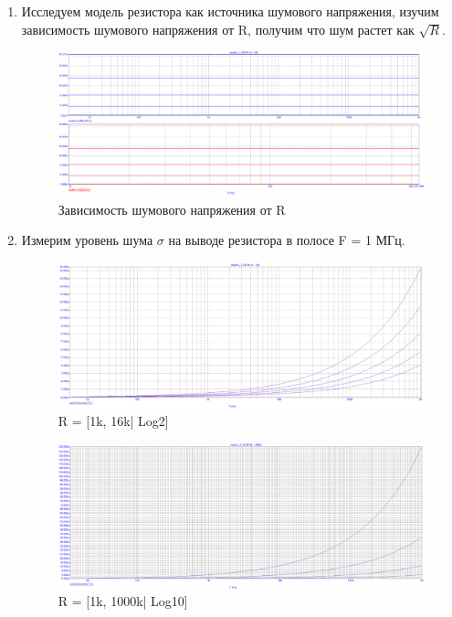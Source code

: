 \documentclass[a4paper, 12pt]{article}%
\begin{document}
\begin{enumerate}

\item

Исследуем модель резистора как источника шумового напряжения, изучим зависимость шумового напряжения от R, получим что шум растет как $\sqrt{R}$.

\begin{figure}[h!]
    \centering
    \includegraphics[scale=0.3]{images/mod1_1_1_2.png}
    \caption{Зависимость шумового напряжения от R}
    \label{fig:eR}
\end{figure}

\item

Измерим уровень шума $\sigma$ на выводе резистора в полосе F = 1 МГц.

\begin{figure}[h!]
    \centering
    \includegraphics[scale=0.3]{images/mod1_1_2_1.png}
    \caption{R = [1k, 16k| Log2]}
    \label{fig:R16}
\end{figure}

\begin{figure}[h!]
    \centering
    \includegraphics[scale=0.3]{images/mod1_1_2_2.png}
    \caption{R = [1k, 1000k| Log10]}
    \label{fig:R1000}
\end{figure}


\end{enumerate}
\end{document}
